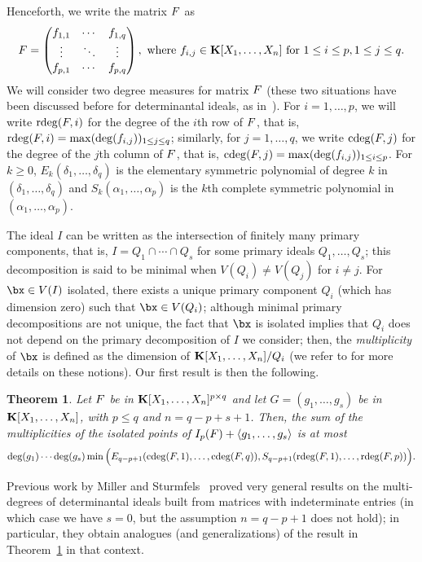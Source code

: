 \documentclass[12pt]{article}
\newtheorem{theorem}[definition]{Theorem}
\begin{document}
Henceforth, we write the matrix ${F}$ as 
\[ {F} = 
\left( \begin{matrix}
f_{1,1} & \cdots & f_{1,q}\\
\vdots & \ddots & \vdots \\
f_{p,1} & \cdots & f_{p,q}
\end{matrix} \right), \ \mathrm{where} \ f_{i,j} \in \mathbf{K}[X_1,\dots,X_n] \ \mathrm{for} \ 1 \leq i \leq p, 1 \leq j \leq q.
\]
We will consider two degree measures for matrix ${F}$ (these two
situations have been discussed before for determinantal ideals, as
in~\cite{NieRan09,MiSt04}). For $i=1,\dots,p$, we will write
$\mathrm{rdeg}({F},i)$ for the degree of the $i$th row of ${F}$, that is,
$\mathrm{rdeg}({F},i)=\max(\deg(f_{i,j}))_{1 \le j \le q}$; similarly, for
$j=1,\dots,q$, we write $\mathrm{cdeg}({F},j)$ for the degree of the $j$th
column of ${F}$, that is, $\mathrm{cdeg}({F},j)=\max(\deg(f_{i,j}))_{1 \le i
  \le p}$. For $k \ge 0$, $E_k(\delta_1,\dots,\delta_q)$ is the
elementary symmetric polynomial of degree $k$ in $(\delta_1, \ldots,
\delta_q)$ and $S_k(\alpha_1,\dots,\alpha_p)$ is the $k$th complete
symmetric polynomial in $(\alpha_1,\dots,\alpha_p)$.  


 The ideal $I$ can be written as the
intersection of finitely many primary components, that is,
$I=Q_1\cap\cdots \cap Q_s$ for some primary ideals $Q_1,\dots,Q_s$;
this decomposition is said to be minimal when $V(Q_i)\neq V(Q_j)$ for
$i\neq j$. For $\bx \in V(I)$ isolated, there exists a unique primary
component $Q_i$ (which has dimension zero) such that $\bx \in V(Q_i)$;
although minimal primary decompositions are not unique, the fact that
$\bx$ is isolated implies that $Q_i$ does not depend on the primary
decomposition of $I$ we consider; then, the \emph{multiplicity} of
$\bx$ is defined as the dimension of $\mathbf{K}[X_1,\dots,X_n]/Q_i$ (we
refer to \cite{Eisenbud95} for more details on these notions). Our
first result is then the following.

\begin{theorem}\label{theo:1}
  Let ${F}$ be in $\mathbf{K}[X_1,\dots,X_n]^{p \times q}$ and let
  $G=(g_1,\dots,g_s)$ be in $\mathbf{K}[X_1,\dots,X_n]$, with $p \le q$ and
  $n=q-p+s+1$. Then, the sum of the multiplicities of the isolated
  points of $I_p({F}) + \langle g_1,\dots,g_s \rangle$ is at most
  $$\deg(g_1) \cdots \deg(g_s) \min\Big(E_{q-p+1}(\mathrm{cdeg}({F},1), \ldots, \mathrm{cdeg}({F},q)), S_{q-p+1}(\mathrm{rdeg}({F},1), \ldots, \mathrm{rdeg}({F},p))\Big).$$
\end{theorem}

Previous work by Miller and Sturmfels~\cite[Chapter~15]{MiSt04} proved
very general results on the multi-degrees of determinantal ideals
built from matrices with indeterminate entries (in which case we have
$s=0$, but the assumption $n=q-p+1$ does not hold); in particular,
they obtain analogues (and generalizations) of the result in
Theorem~\ref{theo:1} in that context.
\end{document}
